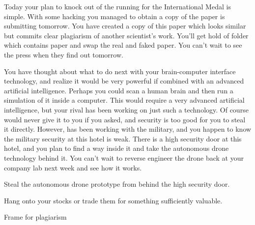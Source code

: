 \documentclass[char]{guildcamp1}
\begin{document}
Today your plan to knock \cScientist{} out of the running for the International Medal is simple.  With some hacking you managed to obtain a copy of the paper \cScientist{\they} is submitting tomorrow.  You have created a copy of this paper which looks similar but commits clear plagiarism of another scientist's work.  You'll get hold of \cScientist{\their} folder which contains \cScientist{\their} paper and swap the real and faked paper.  You can't wait to see the press when they find out tomorrow.

You have thought about what to do next with your brain-computer interface technology, and realize it would be very powerful if combined with an advanced artificial intelligence.  Perhaps you could scan a human brain and then run a simulation of it inside a computer.  This would require a very advanced artificial intelligence, but your rival \cScientist{} has been working on just such a technology.  Of course \cScientist{\they} would never give it to you if you asked, and \cScientist{\their} security is too good for you to steal it directly.  However, \cScientist{\they} has been working with the military, and you happen to know the military security at this hotel is weak.  There is a high security door at this hotel, and you plan to find a way inside it and take the autonomous drone technology behind it.  You can't wait to reverse engineer the drone back at your company lab next week and see how it works.

\begin{itemz}[Goals]
\item Steal the autonomous drone prototype from behind the high
  security door.
\item Hang onto your stocks or trade them for something sufficiently valuable.
\item Frame \cScientist{} for plagiarism
\end{itemz}




\end{document}
